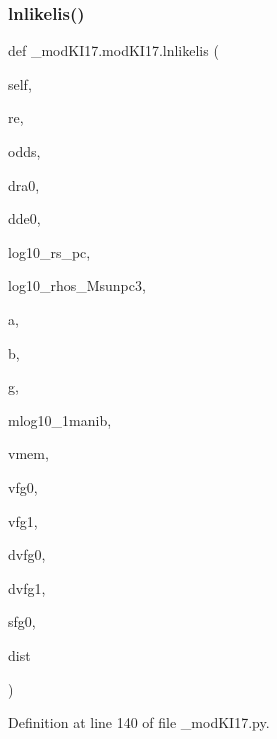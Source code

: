 \subsubsection{\texorpdfstring{lnlikelis()}{lnlikelis()}}
{\footnotesize\ttfamily def \+\_\+mod\+K\+I17.\+mod\+K\+I17.\+lnlikelis (\begin{DoxyParamCaption}\item[{}]{self,  }\item[{}]{re,  }\item[{}]{odds,  }\item[{}]{dra0,  }\item[{}]{dde0,  }\item[{}]{log10\+\_\+rs\+\_\+pc,  }\item[{}]{log10\+\_\+rhos\+\_\+\+Msunpc3,  }\item[{}]{a,  }\item[{}]{b,  }\item[{}]{g,  }\item[{}]{mlog10\+\_\+1manib,  }\item[{}]{vmem,  }\item[{}]{vfg0,  }\item[{}]{vfg1,  }\item[{}]{dvfg0,  }\item[{}]{dvfg1,  }\item[{}]{sfg0,  }\item[{}]{dist }\end{DoxyParamCaption})}



Definition at line 140 of file \+\_\+mod\+K\+I17.\+py.


